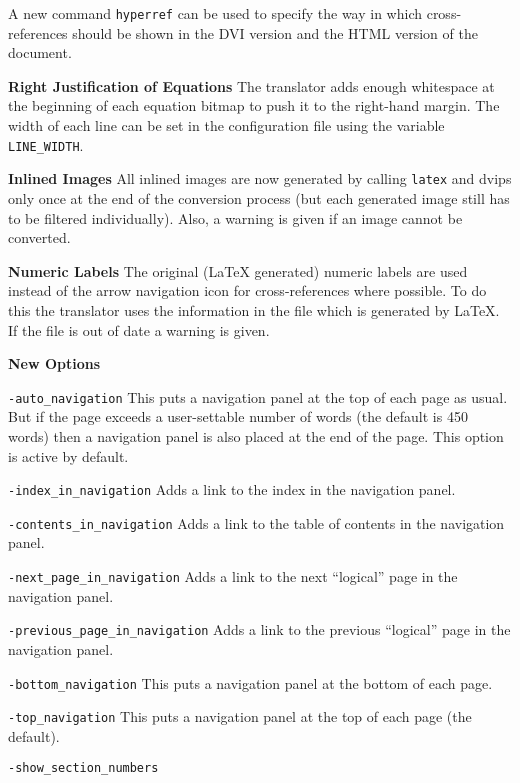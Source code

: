 \begin{htmllist}
\begin{htmllist}
A new command \texttt{hyperref} can be used to specify the way in
which cross-references should be shown in the DVI version and the
HTML version of the document.
\end{htmllist}
\item[\textbf{Right Justification of Equations}]
The translator
adds enough whitespace at the beginning of each equation bitmap
to push it to the right-hand margin. The width of each line can be
set in the configuration file using the variable \texttt{LINE\_WIDTH}.
\item[\textbf{Inlined Images}]
All inlined images are now generated by calling \texttt{latex} and {\fn
dvips} only once
at the end of the conversion process (but each generated image still
has to be filtered individually). Also, a warning is given if an 
image cannot be converted.
\item[\textbf{Numeric Labels}]
The original (LaTeX generated) numeric labels are used instead of
the arrow navigation icon for cross-references where possible.
To do this the translator uses the information in the 
 file which is generated by \LaTeX. If the  file
is out of date a warning is given.
\item[\textbf{New Options}] \hfill
\begin{htmllist}
\item[\texttt{-auto\_navigation}]
This puts a navigation panel 
at the top of each page as usual. But if the page exceeds a
user-settable  
number of words (the default is 450 words) 
then a navigation panel is also placed at the end of
the page. This option is active by default.
\item[\texttt{-index\_in\_navigation}]
Adds a link to the index in the navigation panel.
\item[\texttt{-contents\_in\_navigation}]
Adds a link to the table of contents in the navigation panel.
\item[\texttt{-next\_page\_in\_navigation}]
Adds a link to the next ``logical'' page in the navigation panel.
\item[\texttt{-previous\_page\_in\_navigation}]
Adds a link to the previous ``logical'' page in the navigation panel.
\item[\texttt{-bottom\_navigation}]
This puts a navigation panel at the bottom of each page.
\item[\texttt{-top\_navigation}]
This puts a navigation panel at the top of each page (the default).
\item[\texttt{-show\_section\_numbers}]

\end{htmllist}
\end{htmllist}
